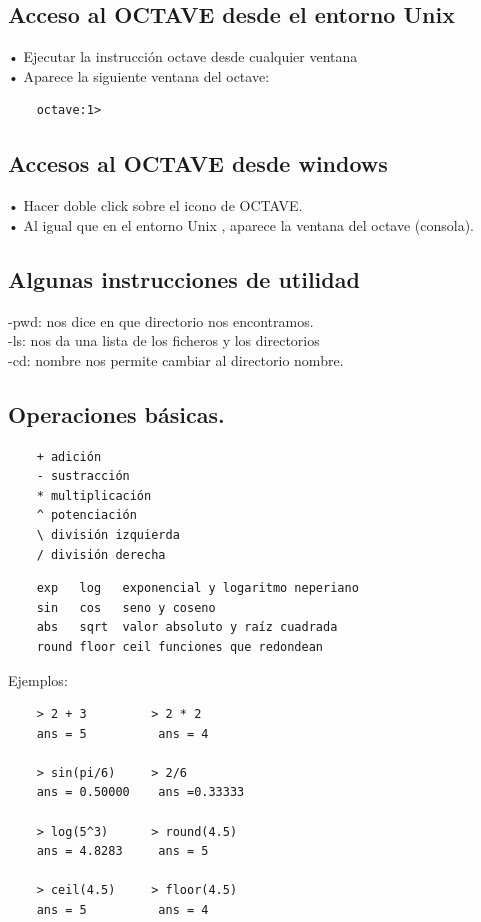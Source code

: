 \documentclass[a4,12pt]{article}
\begin{document}
\subsection{Acceso al OCTAVE desde el entorno Unix}

• Ejecutar la instrucción octave desde cualquier ventana\\
• Aparece la siguiente ventana del octave:\\
\begin{verbatim}
    octave:1>
\end{verbatim}

\subsection{Accesos al OCTAVE desde windows}

• Hacer doble click sobre el icono de OCTAVE.\\
• Al igual que en el entorno Unix , aparece la ventana del octave (consola).\\

\subsection{Algunas instrucciones de utilidad }

-pwd: nos dice en que directorio nos encontramos.\\
-ls: nos da una lista de los ficheros y los directorios\\
-cd: nombre nos permite cambiar al directorio nombre.\\

\subsection{Operaciones básicas.}

\begin{verbatim}
    + adición
    - sustracción
    * multiplicación
    ^ potenciación
    \ división izquierda
    / división derecha
\end{verbatim}

\begin{verbatim}
    exp   log   exponencial y logaritmo neperiano
    sin   cos   seno y coseno
    abs   sqrt  valor absoluto y raíz cuadrada
    round floor ceil funciones que redondean
\end{verbatim}

Ejemplos:

\begin{verbatim}
    > 2 + 3         > 2 * 2
    ans = 5          ans = 4

    > sin(pi/6)     > 2/6
    ans = 0.50000    ans =0.33333

    > log(5^3)      > round(4.5)
    ans = 4.8283     ans = 5

    > ceil(4.5)     > floor(4.5)
    ans = 5          ans = 4
\end{verbatim}
\end{document}
